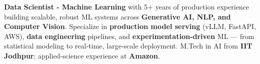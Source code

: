 \documentclass[letter,10pt]{article}
\begin{document}

\textbf{Data Scientist - Machine Learning} with 5+ years of production experience building scalable, robust ML systems across \textbf{Generative AI, NLP, and Computer Vision}.
Specialize in \textbf{production model serving} (vLLM, FastAPI, AWS), \textbf{data engineering} pipelines, and \textbf{experimentation-driven} ML — from statistical modeling to real-time, large-scale deployment.
M.Tech in AI from \textbf{IIT Jodhpur}; applied-science experience at \textbf{Amazon}.
\end{document}
